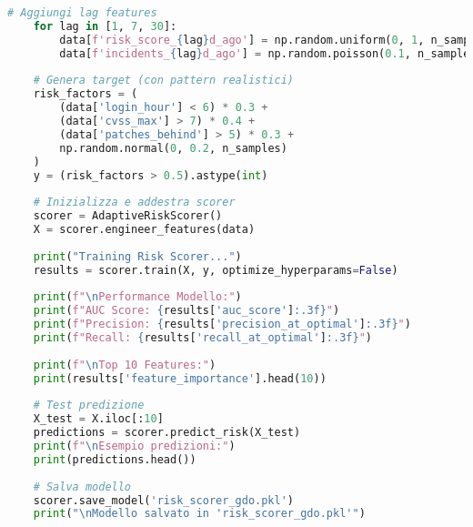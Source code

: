 \begin{lstlisting}[language=Python, caption=Implementazione Risk Scoring adattivo con XGBoost]
    # Aggiungi lag features
    for lag in [1, 7, 30]:
        data[f'risk_score_{lag}d_ago'] = np.random.uniform(0, 1, n_samples)
        data[f'incidents_{lag}d_ago'] = np.random.poisson(0.1, n_samples)
    
    # Genera target (con pattern realistici)
    risk_factors = (
        (data['login_hour'] < 6) * 0.3 +
        (data['cvss_max'] > 7) * 0.4 +
        (data['patches_behind'] > 5) * 0.3 +
        np.random.normal(0, 0.2, n_samples)
    )
    y = (risk_factors > 0.5).astype(int)
    
    # Inizializza e addestra scorer
    scorer = AdaptiveRiskScorer()
    X = scorer.engineer_features(data)
    
    print("Training Risk Scorer...")
    results = scorer.train(X, y, optimize_hyperparams=False)
    
    print(f"\nPerformance Modello:")
    print(f"AUC Score: {results['auc_score']:.3f}")
    print(f"Precision: {results['precision_at_optimal']:.3f}")
    print(f"Recall: {results['recall_at_optimal']:.3f}")
    
    print(f"\nTop 10 Features:")
    print(results['feature_importance'].head(10))
    
    # Test predizione
    X_test = X.iloc[:10]
    predictions = scorer.predict_risk(X_test)
    print(f"\nEsempio predizioni:")
    print(predictions.head())
    
    # Salva modello
    scorer.save_model('risk_scorer_gdo.pkl')
    print("\nModello salvato in 'risk_scorer_gdo.pkl'")
\end{lstlisting}